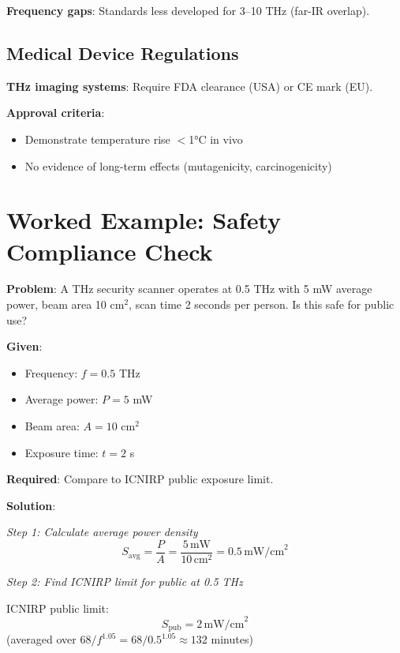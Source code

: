 \textbf{Frequency gaps}: Standards less developed for 3--10 THz (far-IR overlap).

\subsection{Medical Device Regulations}

\textbf{THz imaging systems}: Require FDA clearance (USA) or CE mark (EU).

\textbf{Approval criteria}:
\begin{itemize}
\item Demonstrate temperature rise $<$1°C in vivo
\item No evidence of long-term effects (mutagenicity, carcinogenicity)
\end{itemize}

\section{Worked Example: Safety Compliance Check}

\textbf{Problem}: A THz security scanner operates at 0.5 THz with 5 mW average power, beam area 10 cm$^2$, scan time 2 seconds per person. Is this safe for public use?

\textbf{Given}:
\begin{itemize}
\item Frequency: $f = 0.5$ THz
\item Average power: $P = 5$ mW
\item Beam area: $A = 10$ cm$^2$
\item Exposure time: $t = 2$ s
\end{itemize}

\textbf{Required}: Compare to ICNIRP public exposure limit.

\textbf{Solution}:

\textit{Step 1: Calculate average power density}
\begin{equation}
S_{\text{avg}} = \frac{P}{A} = \frac{5\,\text{mW}}{10\,\text{cm}^2} = 0.5\,\text{mW/cm}^2
\end{equation}

\textit{Step 2: Find ICNIRP limit for public at 0.5 THz}

ICNIRP public limit:
\begin{equation}
S_{\text{pub}} = 2\,\text{mW/cm}^2
\end{equation}
(averaged over $68/f^{1.05} = 68/0.5^{1.05} \approx 132$ minutes)

